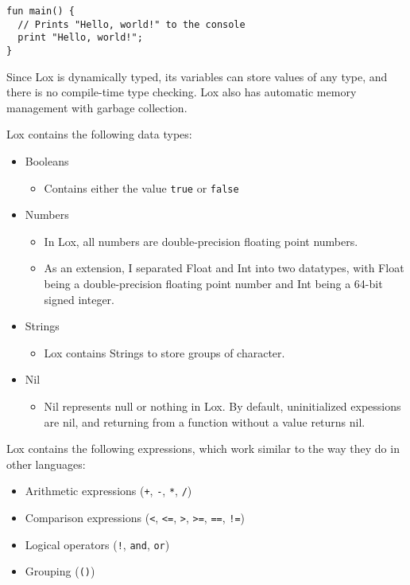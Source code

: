 \documentclass[tikz]{article}
\renewcommand{\:}{\colon}
\begin{document}
\begin{lstlisting}[language=Lox]
fun main() {
  // Prints "Hello, world!" to the console
  print "Hello, world!";
}
\end{lstlisting}

Since Lox is dynamically typed, its variables can store values of any type, and there is no compile-time type checking. Lox also has automatic memory management with garbage collection.

Lox contains the following data types:
\begin{itemize}
  \item Booleans
  \begin{itemize}
    \item Contains either the value \texttt{true} or \texttt{false}
  \end{itemize}
  \item Numbers
  \begin{itemize}
    \item In Lox, all numbers are double-precision floating point numbers.
    \item As an extension, I separated Float and Int into two datatypes, with Float being a double-precision floating point number and Int being a 64-bit signed integer.
  \end{itemize}
  \item Strings
  \begin{itemize}
    \item Lox contains Strings to store groups of character.
  \end{itemize}
  \item Nil
  \begin{itemize}
    \item Nil represents null or nothing in Lox. By default, uninitialized expessions are nil, and returning from a function without a value returns nil. 
  \end{itemize}
\end{itemize}

Lox contains the following expressions, which work similar to the way they do in other languages:
\begin{itemize}
  \item Arithmetic expressions (\texttt{+}, \texttt{-}, \texttt{*}, \texttt{/})
  \item Comparison expressions (\texttt{<}, \texttt{<=}, \texttt{>}, \texttt{>=}, \texttt{==}, \texttt{!=})
  \item Logical operators (\texttt{!}, \texttt{and}, \texttt{or})
  \item Grouping (\texttt{()})
\end{itemize}
\end{document}
